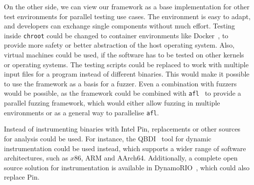 On the other side, we can view our framework as a base implementation for other
test environments for parallel testing use cases. The environment is easy to
adapt, and developers can exchange single components without much effort.
Testing inside \texttt{chroot} could be changed to container environments like
Docker~\cite{docker}, to provide more safety or better abstraction of the host
operating system. Also, virtual machines could be used, if the software has to
be tested on other kernels or operating systems. The testing scripts could be
replaced to work with multiple input files for a program instead of different
binaries. This would make it possible to use the framework as a basis for a
fuzzer. Even a combination with fuzzers would be possible, as the framework
could be combined with \texttt{afl}~\cite{aflweb} to provide a parallel fuzzing
framework, which would either allow fuzzing in multiple environments or as a
general way to parallelise \texttt{afl}.

Instead of instrumenting binaries with Intel Pin, replacements or other sources
for analysis could be used. For instance, the QBDI~\cite{qbdi} tool for dynamic
instrumentation could be used instead, which supports a wider range of software
architectures, such as $x86$, ARM and AArch64. Additionally, a complete open
source solution for instrumentation is available in DynamoRIO~\cite{dynrio},
which could also replace Pin.

